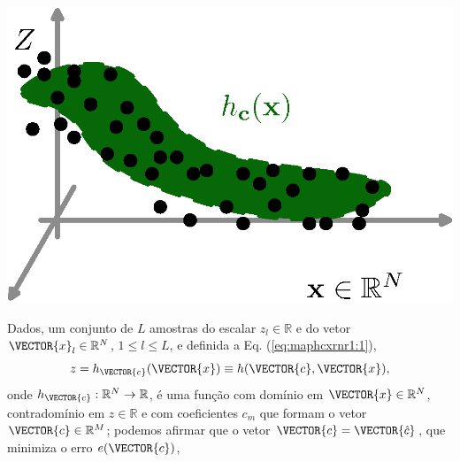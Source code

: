 \begin{theorem}
\label{theo:maphcxrnr1}
~\\
\begin{minipage}{0.4\textwidth}
\centering
\includegraphics[width=0.95\linewidth]{chapters/mapeamento/mapeamento-hxn-nonlinear.eps} 
\end{minipage}
\begin{minipage}{0.6\textwidth}
Dados, um conjunto de $L$ amostras
do escalar $z_l \in \mathbb{R}$ e do vetor $\VECTOR{x}_l \in \mathbb{R}^N$, $1\leq l\leq L$, e 
definida a Eq. (\ref{eq:maphcxrnr1:1}), 
\begin{equation}\label{eq:maphcxrnr1:1}
z=h_{\VECTOR{c}}(\VECTOR{x})\equiv h(\VECTOR{c},\VECTOR{x}),
\end{equation}
onde $h_{\VECTOR{c}}:\mathbb{R}^N \rightarrow \mathbb{R}$, 
é uma função com domínio em  $\VECTOR{x} \in \mathbb{R}^N$, contradomínio em $z\in \mathbb{R}$
e com coeficientes $c_m$ que formam o vetor $\VECTOR{c}\in \mathbb{R}^{M}$;
podemos afirmar que o vetor $\VECTOR{c}=\VECTOR{\hat{c}}$,
que minimiza o erro $e(\VECTOR{c})$,
\end{minipage}


\end{theorem}
